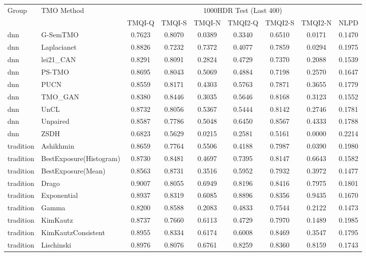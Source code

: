 \begin{table}[t]
\centering
\small
\setlength{\tabcolsep}{4pt}
\begin{tabular}{llccccccc}
\toprule
Group & TMO Method & \multicolumn{7}{c}{1000HDR Test (Last 400)} \\
 &  & TMQI-Q & TMQI-S & TMQI-N & TMQI2-Q & TMQI2-S & TMQI2-N & NLPD \\
\midrule
dnn & G-SemTMO & 0.7623 & 0.8070 & 0.0389 & 0.3340 & 0.6510 & 0.0171 & 0.1470 \\
dnn & Laplacianet & 0.8826 & 0.7232 & 0.7372 & 0.4077 & 0.7859 & 0.0294 & 0.1975 \\
dnn & lei21\_CAN & 0.8291 & 0.8091 & 0.2824 & 0.4729 & 0.7370 & 0.2088 & 0.1539 \\
dnn & PS-TMO & 0.8695 & 0.8043 & 0.5069 & 0.4884 & 0.7198 & 0.2570 & 0.1647 \\
dnn & PUCN & 0.8559 & 0.8171 & 0.4303 & 0.5763 & 0.7871 & 0.3655 & 0.1779 \\
dnn & TMO\_GAN & 0.8380 & 0.8446 & 0.3035 & 0.5646 & 0.8168 & 0.3123 & 0.1552 \\
dnn & UnCL & 0.8732 & 0.8056 & 0.5367 & 0.5444 & 0.8142 & 0.2746 & 0.1781 \\
dnn & Unpaired & 0.8587 & 0.7786 & 0.5048 & 0.6450 & 0.8567 & 0.4333 & 0.1788 \\
dnn & ZSDH & 0.6823 & 0.5629 & 0.0215 & 0.2581 & 0.5161 & 0.0000 & 0.2214 \\
\midrule
tradition & Ashikhmin & 0.8659 & 0.7764 & 0.5506 & 0.4188 & 0.7987 & 0.0390 & 0.1980 \\
tradition & BestExposure(Histogram) & 0.8730 & 0.8481 & 0.4697 & 0.7395 & 0.8147 & 0.6643 & 0.1582 \\
tradition & BestExposure(Mean) & 0.8563 & 0.8731 & 0.3516 & 0.5952 & 0.7932 & 0.3972 & 0.1477 \\
tradition & Drago & 0.9007 & 0.8055 & 0.6949 & 0.8196 & 0.8416 & 0.7975 & 0.1801 \\
tradition & Exponential & 0.8937 & 0.8319 & 0.6085 & 0.8896 & 0.8356 & 0.9435 & 0.1670 \\
tradition & Gamma & 0.8200 & 0.8588 & 0.2083 & 0.4833 & 0.7544 & 0.2122 & 0.1473 \\
tradition & KimKautz & 0.8737 & 0.7660 & 0.6113 & 0.4729 & 0.7970 & 0.1489 & 0.1985 \\
tradition & KimKautzConsistent & 0.8955 & 0.8334 & 0.6174 & 0.6008 & 0.8469 & 0.3547 & 0.1795 \\
tradition & Lischinski & 0.8976 & 0.8076 & 0.6761 & 0.8259 & 0.8360 & 0.8159 & 0.1743 \\

\end{tabular}
\end{table}
